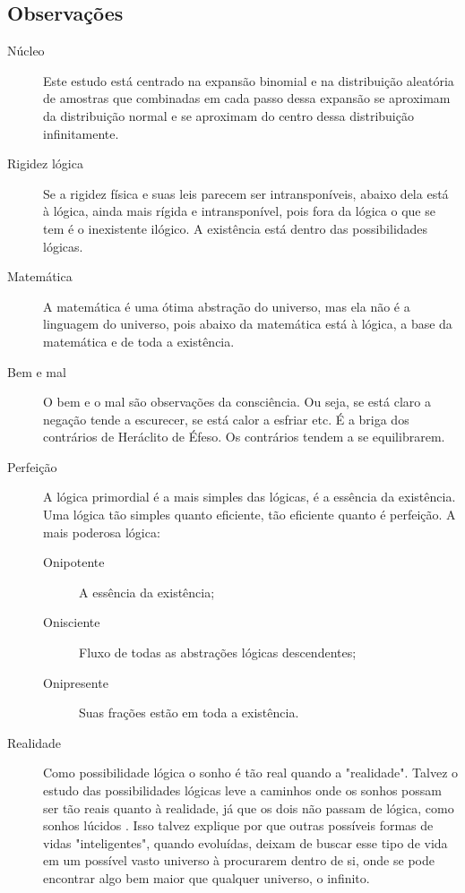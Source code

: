\subsection{Observações}

\begin{description}
   \item[Núcleo] Este estudo está centrado na expansão binomial e na distribuição aleatória de amostras que combinadas em cada passo dessa expansão se aproximam da distribuição normal e se aproximam do centro dessa distribuição infinitamente.
   \item[Rigidez lógica] Se a rigidez física e suas leis parecem ser intransponíveis, abaixo dela está à lógica, ainda mais rígida e intransponível, pois fora da lógica o que se tem é o inexistente ilógico. A existência está dentro das possibilidades lógicas. 
   \item[Matemática] A matemática é uma ótima abstração do universo, mas ela não é a linguagem do universo, pois abaixo da matemática está à lógica, a base da matemática e de toda a existência.
   \item[Bem e mal] O bem e o mal são observações da consciência. Ou seja, se está claro a negação tende a escurecer, se está calor a esfriar etc. É a briga dos contrários de Heráclito de Éfeso. Os contrários tendem a se equilibrarem.
   \item[Perfeição] A lógica primordial é a mais simples das lógicas, é a essência da existência. Uma lógica tão simples quanto eficiente, tão eficiente quanto é perfeição. A mais poderosa lógica:
   \begin{description}
	   \item[Onipotente] A essência da existência;
	   \item[Onisciente] Fluxo de todas as abstrações lógicas descendentes; 
	   \item[Onipresente] Suas frações estão em toda a existência.
   \end{description}
   \item[Realidade] Como possibilidade lógica o sonho é tão real quando a "realidade". Talvez o estudo das possibilidades lógicas leve a caminhos onde os sonhos possam ser tão reais quanto à realidade, já que os dois não passam de lógica, como sonhos lúcidos \cite{ administradores_principio_pareto}. Isso talvez explique por que outras possíveis formas de vidas "inteligentes", quando evoluídas, deixam de buscar esse tipo de vida em um possível vasto universo à procurarem dentro de si, onde se pode encontrar algo bem maior que qualquer universo, o infinito.
\end{description}